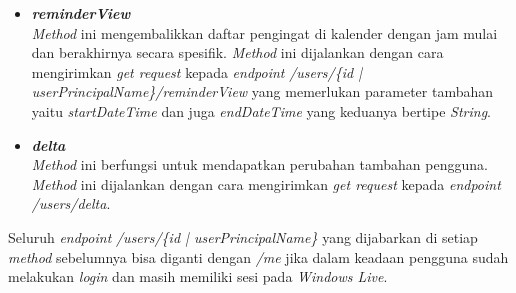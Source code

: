 \begin{itemize}
	\item \textbf{\textit{reminderView}}\\
	\textit{Method} ini mengembalikkan daftar pengingat di kalender dengan jam mulai dan berakhirnya secara spesifik. \textit{Method} ini dijalankan dengan cara mengirimkan \textit{get request} kepada \textit{endpoint} \textit{/users/\{id | userPrincipalName\}/reminderView} yang memerlukan parameter tambahan yaitu \textit{startDateTime} dan juga \textit{endDateTime} yang keduanya bertipe \textit{String}.
	\item \textbf{\textit{delta}}\\
	\textit{Method} ini berfungsi untuk mendapatkan perubahan tambahan pengguna. \textit{Method} ini dijalankan dengan cara mengirimkan \textit{get request} kepada \textit{endpoint} \textit{/users/delta}.
\end{itemize}

Seluruh \textit{endpoint} \textit{/users/\{id | userPrincipalName\}} yang dijabarkan di setiap \textit{method} sebelumnya bisa diganti dengan \textit{/me} jika dalam keadaan pengguna sudah melakukan \textit{login} dan masih memiliki sesi pada \textit{Windows Live}. 

